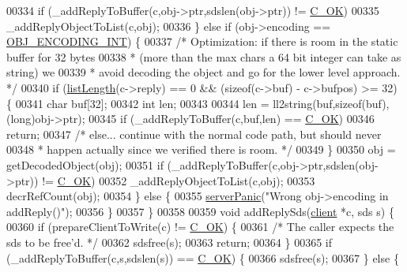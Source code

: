 \begin{DoxyCode}
00334         \textcolor{keywordflow}{if} (\_addReplyToBuffer(c,obj->ptr,sdslen(obj->ptr)) != \hyperlink{server_8h_a303769ef1065076e68731584e758d3e1}{C\_OK})
00335             \_addReplyObjectToList(c,obj);
00336     \} \textcolor{keywordflow}{else} \textcolor{keywordflow}{if} (obj->encoding == \hyperlink{server_8h_ae934cf008a0be0ef009c92c2d006a816}{OBJ\_ENCODING\_INT}) \{
00337         \textcolor{comment}{/* Optimization: if there is room in the static buffer for 32 bytes}
00338 \textcolor{comment}{         * (more than the max chars a 64 bit integer can take as string) we}
00339 \textcolor{comment}{         * avoid decoding the object and go for the lower level approach. */}
00340         \textcolor{keywordflow}{if} (\hyperlink{adlist_8h_afde0ab079f934670e82119b43120e94b}{listLength}(c->reply) == 0 && (\textcolor{keyword}{sizeof}(c->buf) - c->bufpos) >= 32) \{
00341             \textcolor{keywordtype}{char} buf[32];
00342             \textcolor{keywordtype}{int} len;
00343 
00344             len = ll2string(buf,\textcolor{keyword}{sizeof}(buf),(\textcolor{keywordtype}{long})obj->ptr);
00345             \textcolor{keywordflow}{if} (\_addReplyToBuffer(c,buf,len) == \hyperlink{server_8h_a303769ef1065076e68731584e758d3e1}{C\_OK})
00346                 \textcolor{keywordflow}{return};
00347             \textcolor{comment}{/* else... continue with the normal code path, but should never}
00348 \textcolor{comment}{             * happen actually since we verified there is room. */}
00349         \}
00350         obj = getDecodedObject(obj);
00351         \textcolor{keywordflow}{if} (\_addReplyToBuffer(c,obj->ptr,sdslen(obj->ptr)) != \hyperlink{server_8h_a303769ef1065076e68731584e758d3e1}{C\_OK})
00352             \_addReplyObjectToList(c,obj);
00353         decrRefCount(obj);
00354     \} \textcolor{keywordflow}{else} \{
00355         \hyperlink{server_8h_a11cc378e7778a830b41240578de3b204}{serverPanic}(\textcolor{stringliteral}{"Wrong obj->encoding in addReply()"});
00356     \}
00357 \}
00358 
00359 \textcolor{keywordtype}{void} addReplySds(\hyperlink{structclient}{client} *c, sds s) \{
00360     \textcolor{keywordflow}{if} (prepareClientToWrite(c) != \hyperlink{server_8h_a303769ef1065076e68731584e758d3e1}{C\_OK}) \{
00361         \textcolor{comment}{/* The caller expects the sds to be free'd. */}
00362         sdsfree(s);
00363         \textcolor{keywordflow}{return};
00364     \}
00365     \textcolor{keywordflow}{if} (\_addReplyToBuffer(c,s,sdslen(s)) == \hyperlink{server_8h_a303769ef1065076e68731584e758d3e1}{C\_OK}) \{
00366         sdsfree(s);
00367     \} \textcolor{keywordflow}{else} \{

\end{DoxyCode}
